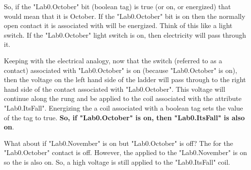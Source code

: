 
So, if the "Lab0.October" bit (boolean tag) is true (or on, or energized) that would mean that it is October. If the "Lab0.October" bit is on then the normally open contact it is associated with will be energized. Think of this like a light switch. If the "Lab0.October" light switch is on, then electricity will pass through it. 

Keeping with the electrical analogy, now that the switch (referred to as a contact) associated with "Lab0.October" is on (because "Lab0.October" is on), then the voltage on the left hand side of the ladder will pass through to the right hand side of the contact associated with "Lab0.October". This voltage will continue along the rung and be applied to the coil associated with the attribute "Lab0.Its\textunderscore Fall". Energizing the a coil associated with a boolean tag sets the value of the tag to true. \textbf{So, if "Lab0.October" is on, then "Lab0.Its\textunderscore Fall" is also on}.


What about if "Lab0.November" is on but "Lab0.October" is off? The \rungoutcondition for the "Lab0.October" contact is off. However, the \rungincondition applied to the "Lab0.November" is on so the \rungoutcondition is also on. So, a high voltage is still applied to the "Lab0.Its\textunderscore Fall" coil.


